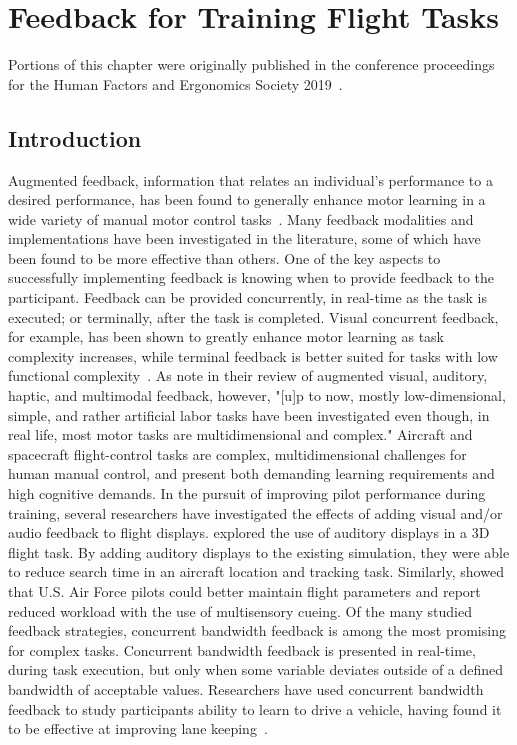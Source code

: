 \chapter{Feedback for Training Flight Tasks}
\label{chapter:aircraftfeedback}

Portions of this chapter were originally published in the conference proceedings for the Human Factors and Ergonomics Society 2019~\citep{RN42}.

\section{Introduction}
Augmented feedback, information that relates an individual's performance to a desired performance, has been found to generally enhance motor learning in a wide variety of manual motor control tasks~\citep{salmoni_knowledge_1984}.
Many feedback modalities and implementations have been investigated in the literature, some of which have been found to be more effective than others.
One of the key aspects to successfully implementing feedback is knowing when to provide feedback to the participant.
Feedback can be provided concurrently, in real-time as the task is executed; or terminally, after the task is completed.
Visual concurrent feedback, for example, has been shown to greatly enhance motor learning as task complexity increases, while terminal feedback is better suited for tasks with low functional complexity~\citep{sigrist_augmented_2013}.
As \citeauthor{sigrist_augmented_2013} note in their review of augmented visual, auditory, haptic, and multimodal feedback, however, "[u]p to now, mostly low-dimensional, simple, and rather artificial labor tasks have been investigated even though, in real life, most motor tasks are multidimensional and complex."
Aircraft and spacecraft flight-control tasks are complex, multidimensional challenges for human manual control, and present both demanding learning requirements and high cognitive demands.
In the pursuit of improving pilot performance during training, several researchers have investigated the effects of adding visual and/or audio feedback to flight displays.
\citeauthor{doi:10.1518/001872096778940859} explored the use of auditory displays in a 3D flight task.
By adding auditory displays to the existing simulation, they were able to reduce search time in an aircraft location and tracking task.
Similarly, \citeauthor{doi:10.1207/s15327108ijap1403} showed that U.S. Air Force pilots could better maintain flight parameters and report reduced workload with the use of multisensory cueing.
Of the many studied feedback strategies, concurrent bandwidth feedback is among the most promising for complex tasks.
Concurrent bandwidth feedback is presented in real-time, during task execution, but only when some variable deviates outside of a defined bandwidth of acceptable values.
Researchers have used concurrent bandwidth feedback to study participants ability to learn to drive a vehicle, having found it to be effective at improving lane keeping~\citep{de_groot_effect_2011}.

